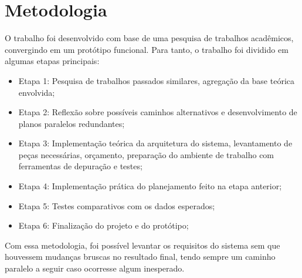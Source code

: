 \chapter{Metodologia}
\label{Métodos de implementação}

O trabalho foi desenvolvido com base de uma pesquisa de trabalhos acadêmicos, convergindo em um protótipo funcional. Para tanto, o trabalho foi dividido em algumas etapas principais:

\begin{itemize}
\item{Etapa 1: Pesquisa de trabalhos passados similares, agregação da base teórica envolvida;}
\item{Etapa 2: Reflexão sobre possíveis caminhos alternativos e desenvolvimento de planos paralelos redundantes;}
\item{Etapa 3: Implementação teórica da arquitetura do sistema, levantamento de peças necessárias, orçamento, preparação do ambiente de trabalho com ferramentas de depuração e testes;}
\item{Etapa 4: Implementação prática do planejamento feito na etapa anterior;}
\item{Etapa 5: Testes comparativos com os dados esperados;}
\item{Etapa 6: Finalização do projeto e do protótipo;}
\end{itemize}

Com essa metodologia, foi possível levantar os requisitos do sistema sem que houvessem mudanças bruscas no resultado final, tendo sempre um caminho paralelo a seguir caso ocorresse algum inesperado.